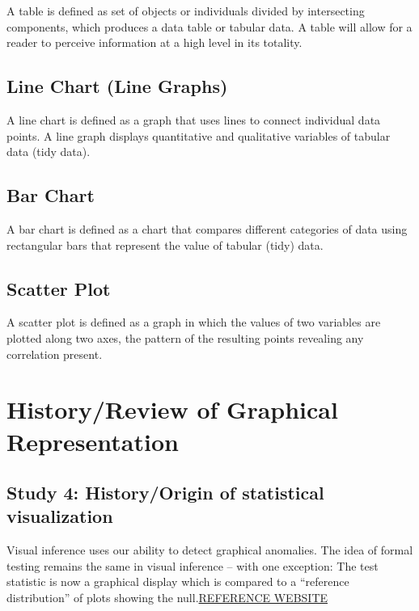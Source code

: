 \documentclass[print]{nuthesis}
\begin{document}
A table is defined as set of objects or individuals divided by intersecting components, which produces a data table or tabular data. A table will allow for a reader to perceive information at a high level in its totality.

\hypertarget{line-chart-line-graphs}{%
\subsection{Line Chart (Line Graphs)}\label{line-chart-line-graphs}}

A line chart is defined as a graph that uses lines to connect individual data points. A line graph displays quantitative and qualitative variables of tabular data (tidy data).

\hypertarget{bar-chart}{%
\subsection{Bar Chart}\label{bar-chart}}

A bar chart is defined as a chart that compares different categories of data using rectangular bars that represent the value of tabular (tidy) data.

\hypertarget{scatter-plot}{%
\subsection{Scatter Plot}\label{scatter-plot}}

A scatter plot is defined as a graph in which the values of two variables are plotted along two axes, the pattern of the resulting points revealing any correlation present.

\hypertarget{historyreview-of-graphical-representation}{%
\section{History/Review of Graphical Representation}\label{historyreview-of-graphical-representation}}

\hypertarget{study-4-historyorigin-of-statistical-visualization}{%
\subsection{Study 4: History/Origin of statistical visualization}\label{study-4-historyorigin-of-statistical-visualization}}

Visual inference uses our ability to detect graphical anomalies. The idea of formal testing remains the same in visual inference -- with one exception: The test statistic is now a graphical display which is compared to a ``reference distribution'' of plots showing the null.\href{}{REFERENCE WEBSITE}
\end{document}
